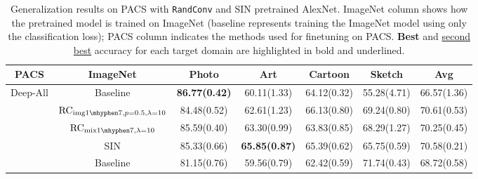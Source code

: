 \documentclass{article} \usepackage{iclr2021_conference,times}
\newcommand{\RandConv}{\texttt{RandConv}}
\begin{document}
\begin{table}[t]
\small
	\caption{Generalization results on PACS with {\RandConv} and SIN pretrained AlexNet.  ImageNet column shows how the pretrained model is trained on ImageNet (baseline represents training the ImageNet model using only the classification loss); PACS column indicates the methods used for finetuning on PACS. \textbf{Best} and \underline{second best} accuracy for each target domain are highlighted in bold and underlined.}
	\label{table:transfer_PACS}
	\centering
	\begin{tabular}{c|c|ccccc}
		\toprule
		PACS                & ImageNet & Photo & Art & Cartoon & Sketch          & Avg                  \\
		\toprule
		\multirow{4}{*}{Deep-All} & 
		Baseline     & \textbf{86.77\tiny(0.42)}          & 60.11\tiny(1.33)          & 64.12\tiny(0.32)          & 55.28\tiny(4.71)          & 66.57\tiny(1.36)          \\
		
		&	$\text{RC}_{\text{img}1\mhyphen7,p=0.5,\lambda=10}$  & 84.48\tiny(0.52)          & 62.61\tiny(1.23)          & 66.13\tiny(0.80)          & 69.24\tiny(0.80)          & 70.61\tiny(0.53)          \\
		
		&	$\text{RC}_{\text{mix}1\mhyphen7, \lambda=10}$    & 85.59\tiny(0.40)          & 63.30\tiny(0.99)          & 63.83\tiny(0.85)          & 68.29\tiny(1.27)          & 70.25\tiny(0.45)          \\
		& {SIN} & 85.33\tiny(0.66)	& \textbf{65.85\tiny(0.87)}&	65.39\tiny(0.62)	&65.75\tiny(0.59)&	70.58\tiny(0.21) \\
		
		\midrule
	
		   & Baseline     & 81.15\tiny(0.76)          & 59.56\tiny(0.79)          & 62.42\tiny(0.59)          & 71.74\tiny(0.43)          & 68.72\tiny(0.58)          \\


\end{tabular}
\end{table}
\end{document}
